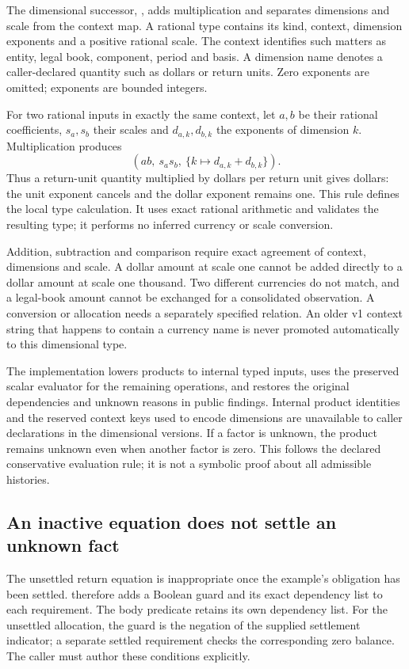 The dimensional successor, , adds multiplication and
separates dimensions and scale from the context map. A rational type contains
its kind, context, dimension exponents and a positive rational scale. The
context identifies such matters as entity, legal book, component, period and
basis. A dimension name denotes a caller-declared quantity such as dollars or
return units. Zero exponents are omitted; exponents are bounded integers.

For two rational inputs in exactly the same context, let $a,b$ be their rational
coefficients, $s_a,s_b$ their scales and $d_{a,k},d_{b,k}$ the exponents of dimension
$k$. Multiplication produces
\[
 (ab,\ s_a s_b,\ \{k\mapsto d_{a,k}+d_{b,k}\}).
\]
Thus a return-unit quantity multiplied by dollars per return unit gives dollars:
the unit exponent cancels and the dollar exponent remains one. This rule defines
the local type calculation. It uses exact rational arithmetic and validates the
resulting type; it performs no inferred currency or scale conversion.

Addition, subtraction and comparison require exact agreement of context,
dimensions and scale. A dollar amount at scale one cannot be added directly to
a dollar amount at scale one thousand. Two different currencies do not match,
and a legal-book amount cannot be exchanged for a consolidated observation.
A conversion or allocation needs a separately specified relation. An older v1
context string that happens to contain a currency name is never promoted
automatically to this dimensional type.

The implementation lowers products to internal typed inputs, uses the preserved
scalar evaluator for the remaining operations, and restores the original
dependencies and unknown reasons in public findings. Internal product identities
and the reserved context keys used to encode dimensions are unavailable to caller
declarations in the dimensional versions. If a factor is unknown, the product
remains unknown even when another factor is zero. This follows the declared
conservative evaluation rule; it is not a symbolic proof about all admissible
histories.

\subsection{An inactive equation does not settle an unknown fact}

The unsettled return equation is inappropriate once the example's obligation
has been settled.  therefore adds a Boolean guard and
its exact dependency list to each requirement. The body predicate retains its
own dependency list. For the unsettled allocation, the guard is the negation of
the supplied settlement indicator; a separate settled requirement checks the
corresponding zero balance. The caller must author these conditions explicitly.

